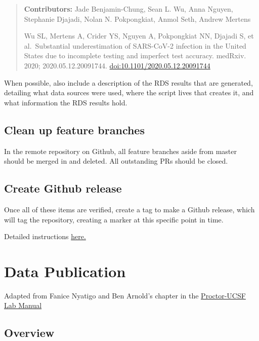 \documentclass[
]{book}
\begin{document}
\begin{quote}
\textbf{Contributors:} Jade Benjamin-Chung, Sean L. Wu, Anna Nguyen, Stephanie Djajadi, Nolan N. Pokpongkiat, Anmol Seth, Andrew Mertens

Wu SL, Mertens A, Crider YS, Nguyen A, Pokpongkiat NN, Djajadi S, et al.~Substantial underestimation of SARS-CoV-2 infection in the United States due to incomplete testing and imperfect test accuracy. medRxiv. 2020; 2020.05.12.20091744. \url{doi:10.1101/2020.05.12.20091744}
\end{quote}

When possible, also include a description of the RDS results that are generated, detailing what data sources were used, where the script lives that creates it, and what information the RDS results hold.

\section{Clean up feature branches}\label{clean-up-feature-branches}

In the remote repository on Github, all feature branches aside from master should be merged in and deleted. All outstanding PRs should be closed.

\section{Create Github release}\label{create-github-release}

Once all of these items are verified, create a tag to make a Github release, which will tag the repository, creating a marker at this specific point in time.

Detailed instructions \href{https://docs.github.com/en/enterprise/2.13/user/articles/creating-releases}{here.}

\chapter{Data Publication}\label{data-publication}

Adapted from Fanice Nyatigo and Ben Arnold's chapter in the \href{https://urlisolation.com/browser?clickId=524DE241-3F8F-4C98-B619-3C278374BF64&traceToken=1728923499\%3Bucsfmed_hosted\%3Bhttps\%3A\%2F\%2Fproctor-ucsf.github.io\%2Fd&url=https\%3A\%2F\%2Fproctor-ucsf.github.io\%2Fdcc-handbook\%2Fpublicdata.html}{Proctor-UCSF Lab Manual}

\section{Overview}\label{overview}
\end{document}

